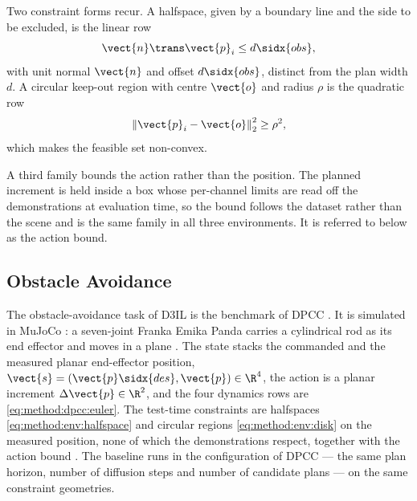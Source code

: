 Two constraint forms recur. A halfspace, given by a boundary line and the side to be excluded, is the
linear row
\begin{equation}\label{eq:method:env:halfspace}
  \vect{n}\trans\vect{p}_{i} \le d\sidx{obs} ,
\end{equation}
with unit normal $\vect{n}$ and offset $d\sidx{obs}$, distinct from the plan width $d$. A circular keep-out region with centre $\vect{o}$ and radius
$\rho$ is the quadratic row
\begin{equation}\label{eq:method:env:disk}
  \left\|\vect{p}_{i}-\vect{o}\right\|_{2}^{2} \ge \rho^{2},
\end{equation}
which makes the feasible set non-convex.

A third family bounds the action rather than the position. The planned increment is held inside a
box whose per-channel limits are read off the demonstrations at evaluation time, so the bound
follows the dataset rather than the scene and is the same family in all three environments. It is
referred to below as the action bound.

\subsection{Obstacle Avoidance}\label{sec:method:env:avoiding}

The obstacle-avoidance task of D3IL \parencite{jia2024towards} is the benchmark of \ac{DPCC}
\parencite[Sec.~6.1]{romer2025diffusion}. It is simulated in MuJoCo
\parencite{todorov2012mujoco}: a seven-joint Franka Emika Panda carries a cylindrical rod as its end
effector and moves in a plane \parencite[Sec.~3.3]{jia2024towards}. The state stacks the commanded and the measured planar
end-effector position, $\vect{s} = (\vect{p}\sidx{des},\vect{p})\in\R^{4}$, the action is a planar
increment $\Delta\vect{p}\in\R^{2}$, and the four dynamics rows are \eqref{eq:method:dpcc:euler}. The
test-time constraints are halfspaces \eqref{eq:method:env:halfspace} and circular regions
\eqref{eq:method:env:disk} on the measured position, none of which the demonstrations respect, together
with the action bound \parencite[Sec.~6.1]{romer2025diffusion}. The baseline runs in the configuration of \ac{DPCC} --- the
same plan horizon, number of diffusion steps and number of candidate plans --- on the
same constraint geometries.

